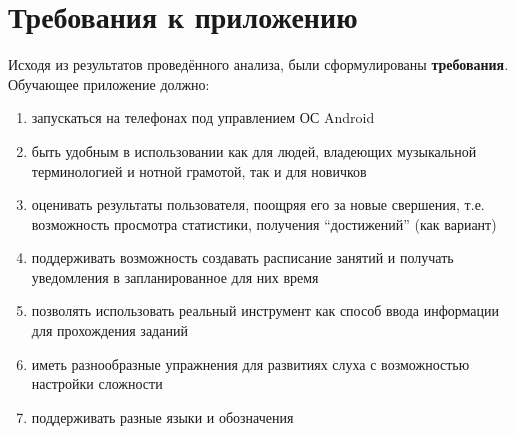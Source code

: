 \section{Требования к приложению}
Исходя из результатов проведённого анализа, были сформулированы \textbf{требования}. Обучающее приложение должно: 
\begin{enumerate}
\item запускаться на телефонах под управлением ОС Android
\item быть удобным в использовании как для людей, владеющих музыкальной терминологией и нотной грамотой, так и для новичков
\item оценивать результаты пользователя, поощряя его за новые свершения, т.е. возможность просмотра статистики, получения “достижений” (как вариант)
\item поддерживать возможность создавать расписание занятий и получать уведомления в запланированное для них время
\item позволять использовать реальный инструмент как способ ввода информации для прохождения заданий
\item иметь разнообразные упражнения для развитиях слуха с возможностью настройки сложности 
\item поддерживать разные языки и обозначения
\end{enumerate}\par
